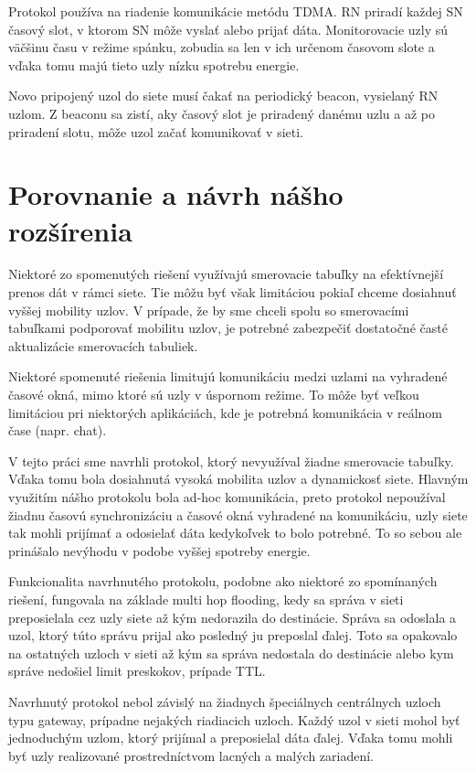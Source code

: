 \documentclass[slovak,master]{diploma}
\begin{document}
Protokol používa na riadenie komunikácie metódu TDMA. RN priradí každej SN časový slot, v ktorom SN môže vyslať alebo prijať dáta.
Monitorovacie uzly sú väčšinu času v režime spánku, zobudia sa len v ich určenom časovom slote a vďaka tomu majú tieto uzly nízku spotrebu energie.

Novo pripojený uzol do siete musí čakať na periodický beacon, vysielaný RN uzlom. Z beaconu sa zistí, aky časový slot je priradený danému uzlu a až po priradení slotu, môže uzol začať komunikovať v sieti.



\section{Porovnanie a návrh nášho rozšírenia}
Niektoré zo spomenutých riešení využívajú smerovacie tabuľky na efektívnejší prenos dát v rámci siete. Tie môžu byť však limitáciou pokiaľ 
chceme dosiahnuť vyššej mobility uzlov. V prípade, že by sme chceli spolu so smerovacími tabuľkami podporovať mobilitu uzlov, je potrebné zabezpečiť 
dostatočné časté aktualizácie smerovacích tabuliek.

Niektoré spomenuté riešenia limitujú komunikáciu medzi uzlami na vyhradené časové okná, mimo ktoré sú uzly v úspornom režime. To môže byť 
veľkou limitáciou pri niektorých aplikáciách, kde je potrebná komunikácia v reálnom čase  (napr. chat).

V tejto práci sme navrhli protokol, ktorý nevyužíval žiadne smerovacie tabuľky. Vďaka tomu bola dosiahnutá vysoká mobilita uzlov a dynamickosť siete. 
Hlavným využitím nášho protokolu bola ad-hoc komunikácia, preto protokol nepoužíval 
žiadnu časovú synchronizáciu a časové okná vyhradené na komunikáciu, uzly siete tak mohli prijímať a odosielať dáta kedykoľvek to bolo potrebné.
To so sebou ale prinášalo nevýhodu v podobe vyššej spotreby energie.

Funkcionalita navrhnutého protokolu, podobne ako niektoré zo spomínaných riešení, fungovala na základe multi hop flooding, 
kedy sa správa v sieti preposielala cez uzly siete až kým nedorazila do destinácie.
Správa sa odoslala a uzol, ktorý túto správu prijal ako posledný ju preposlal ďalej. Toto sa opakovalo na ostatných uzloch v sieti až kým sa správa nedostala do destinácie alebo kym správe nedošiel limit preskokov, prípade TTL.

Navrhnutý protokol nebol závislý na žiadnych špeciálnych centrálnych uzloch typu gateway, prípadne nejakých riadiacich uzloch. Každý uzol v sieti mohol byť jednoduchým uzlom, ktorý prijímal a preposielal dáta ďalej.
Vďaka tomu mohli byť uzly realizované prostredníctvom lacných a malých zariadení.
\end{document}
